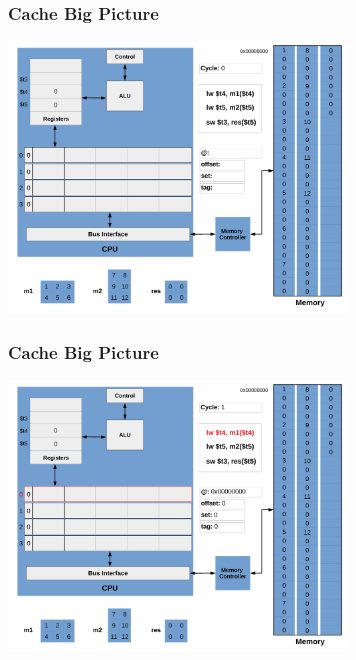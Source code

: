 \documentclass{beamer}
\begin{document}
\begin{frame}[fragile]
\frametitle{Cache Big Picture}

\begin{center}
\vspace*{-0.23cm}
\hspace*{-1cm}\includegraphics[width=9cm]{cache1.pdf}
\end{center}

\end{frame}

\begin{frame}[fragile]
\frametitle{Cache Big Picture}

\begin{center}
\vspace*{-0.23cm}
\hspace*{-1cm}\includegraphics[width=9cm]{cache2.pdf}
\end{center}

\end{frame}
\end{document}
